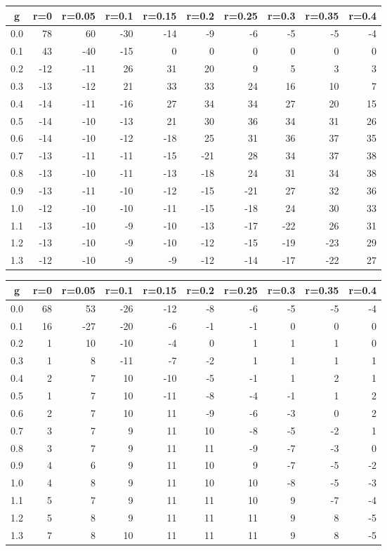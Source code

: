 %
\begin{table}[!tbp]
 \begin{center}
 \begin{tabular}{rrrrrrrrrr}\hline\hline
\multicolumn{1}{c}{g}&\multicolumn{1}{c}{r=0}&\multicolumn{1}{c}{r=0.05}&\multicolumn{1}{c}{r=0.1}&\multicolumn{1}{c}{r=0.15}&\multicolumn{1}{c}{r=0.2}&\multicolumn{1}{c}{r=0.25}&\multicolumn{1}{c}{r=0.3}&\multicolumn{1}{c}{r=0.35}&\multicolumn{1}{c}{r=0.4}\tabularnewline
\hline
0.0& 78& 60&-30&-14& -9& -6& -5& -5&-4\tabularnewline
0.1& 43&-40&-15&  0&  0&  0&  0&  0& 0\tabularnewline
0.2&-12&-11& 26& 31& 20&  9&  5&  3& 3\tabularnewline
0.3&-13&-12& 21& 33& 33& 24& 16& 10& 7\tabularnewline
0.4&-14&-11&-16& 27& 34& 34& 27& 20&15\tabularnewline
0.5&-14&-10&-13& 21& 30& 36& 34& 31&26\tabularnewline
0.6&-14&-10&-12&-18& 25& 31& 36& 37&35\tabularnewline
0.7&-13&-11&-11&-15&-21& 28& 34& 37&38\tabularnewline
0.8&-13&-10&-11&-13&-18& 24& 31& 34&38\tabularnewline
0.9&-13&-11&-10&-12&-15&-21& 27& 32&36\tabularnewline
1.0&-12&-10&-10&-11&-15&-18& 24& 30&33\tabularnewline
1.1&-13&-10& -9&-10&-13&-17&-22& 26&31\tabularnewline
1.2&-13&-10& -9&-10&-12&-15&-19&-23&29\tabularnewline
1.3&-12&-10& -9& -9&-12&-14&-17&-22&27\tabularnewline
\hline
\end{tabular}

\end{center}

\end{table}

%
\begin{table}[!tbp]
 \begin{center}
 \begin{tabular}{rrrrrrrrrr}\hline\hline
\multicolumn{1}{c}{g}&\multicolumn{1}{c}{r=0}&\multicolumn{1}{c}{r=0.05}&\multicolumn{1}{c}{r=0.1}&\multicolumn{1}{c}{r=0.15}&\multicolumn{1}{c}{r=0.2}&\multicolumn{1}{c}{r=0.25}&\multicolumn{1}{c}{r=0.3}&\multicolumn{1}{c}{r=0.35}&\multicolumn{1}{c}{r=0.4}\tabularnewline
\hline
0.0&68& 53&-26&-12&-8&-6&-5&-5&-4\tabularnewline
0.1&16&-27&-20& -6&-1&-1& 0& 0& 0\tabularnewline
0.2& 1& 10&-10& -4& 0& 1& 1& 1& 0\tabularnewline
0.3& 1&  8&-11& -7&-2& 1& 1& 1& 1\tabularnewline
0.4& 2&  7& 10&-10&-5&-1& 1& 2& 1\tabularnewline
0.5& 1&  7& 10&-11&-8&-4&-1& 1& 2\tabularnewline
0.6& 2&  7& 10& 11&-9&-6&-3& 0& 2\tabularnewline
0.7& 3&  7&  9& 11&10&-8&-5&-2& 1\tabularnewline
0.8& 3&  7&  9& 11&11&-9&-7&-3& 0\tabularnewline
0.9& 4&  6&  9& 11&10& 9&-7&-5&-2\tabularnewline
1.0& 4&  8&  9& 11&10&10&-8&-5&-3\tabularnewline
1.1& 5&  7&  9& 11&11&10& 9&-7&-4\tabularnewline
1.2& 5&  8&  9& 11&11&11& 9& 8&-5\tabularnewline
1.3& 7&  8& 10& 11&11&11& 9& 8&-5\tabularnewline
\hline
\end{tabular}

\end{center}

\end{table}

